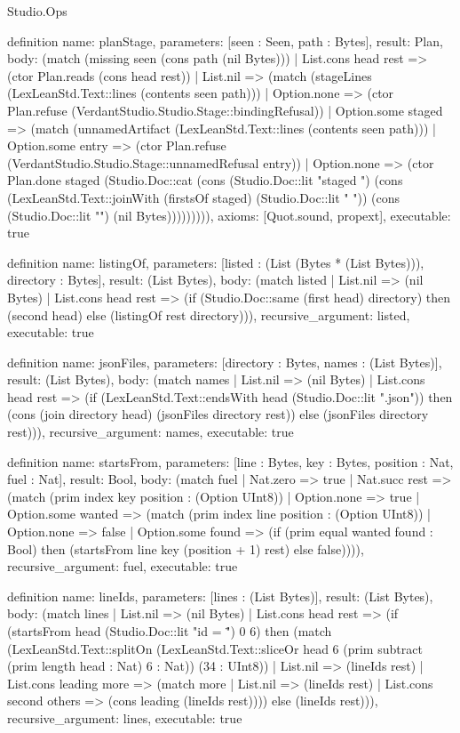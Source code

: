 \begin{lexlean}{Studio.Ops}
\begin{semanticmodule}
{definition{
  name: planStage,
  parameters: [seen : Seen, path : Bytes],
  result: Plan,
  body: (match (missing seen (cons path (nil Bytes)))
    | List.cons head rest => (ctor Plan.reads (cons head rest))
    | List.nil => (match (stageLines (LexLeanStd.Text::lines (contents seen path)))
      | Option.none => (ctor Plan.refuse (VerdantStudio.Studio.Stage::bindingRefusal))
      | Option.some staged => (match (unnamedArtifact (LexLeanStd.Text::lines (contents seen path)))
        | Option.some entry => (ctor Plan.refuse (VerdantStudio.Studio.Stage::unnamedRefusal entry))
        | Option.none => (ctor Plan.done staged (Studio.Doc::cat (cons (Studio.Doc::lit "staged ") (cons (LexLeanStd.Text::joinWith (firstsOf staged) (Studio.Doc::lit " ")) (cons (Studio.Doc::lit "\n") (nil Bytes))))))))),
  axioms: [Quot.sound, propext],
  executable: true
}

definition{
  name: listingOf,
  parameters: [listed : (List (Bytes * (List Bytes))), directory : Bytes],
  result: (List Bytes),
  body: (match listed
    | List.nil => (nil Bytes)
    | List.cons head rest => (if (Studio.Doc::same (first head) directory) then (second head) else (listingOf rest directory))),
  recursive_argument: listed,
  executable: true
}

definition{
  name: jsonFiles,
  parameters: [directory : Bytes, names : (List Bytes)],
  result: (List Bytes),
  body: (match names
    | List.nil => (nil Bytes)
    | List.cons head rest => (if (LexLeanStd.Text::endsWith head (Studio.Doc::lit ".json")) then (cons (join directory head) (jsonFiles directory rest)) else (jsonFiles directory rest))),
  recursive_argument: names,
  executable: true
}

definition{
  name: startsFrom,
  parameters: [line : Bytes, key : Bytes, position : Nat, fuel : Nat],
  result: Bool,
  body: (match fuel
    | Nat.zero => true
    | Nat.succ rest => (match (prim index key position : (Option UInt8))
      | Option.none => true
      | Option.some wanted => (match (prim index line position : (Option UInt8))
        | Option.none => false
        | Option.some found => (if (prim equal wanted found : Bool) then (startsFrom line key (position + 1) rest) else false)))),
  recursive_argument: fuel,
  executable: true
}

definition{
  name: lineIds,
  parameters: [lines : (List Bytes)],
  result: (List Bytes),
  body: (match lines
    | List.nil => (nil Bytes)
    | List.cons head rest => (if (startsFrom head (Studio.Doc::lit "id = \"") 0 6) then (match (LexLeanStd.Text::splitOn (LexLeanStd.Text::sliceOr head 6 (prim subtract (prim length head : Nat) 6 : Nat)) (34 : UInt8))
      | List.nil => (lineIds rest)
      | List.cons leading more => (match more
        | List.nil => (lineIds rest)
        | List.cons second others => (cons leading (lineIds rest)))) else (lineIds rest))),
  recursive_argument: lines,
  executable: true
}

}
\end{semanticmodule}
\end{lexlean}

